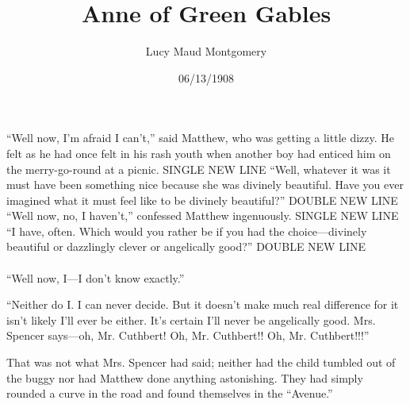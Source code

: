 \documentclass[a4paper]{article}
\title{Anne of Green Gables}
\author{Lucy Maud Montgomery}
\date{06/13/1908}
\begin{document}
\maketitle
``Well now, I'm afraid I can't,'' said Matthew, who was getting a little dizzy. He felt as he had once felt in his rash youth when another boy had enticed him on the merry-go-round at a picnic. SINGLE NEW LINE \newline ``Well, whatever it was it must have been something nice because she was divinely beautiful. Have you ever imagined what it must feel like to be divinely beautiful?'' DOUBLE NEW LINE \newline \newline ``Well now, no, I haven't,'' confessed Matthew ingenuously. SINGLE NEW LINE\\``I have, often. Which would you rather be if you had the choice---divinely beautiful or dazzlingly clever or angelically good?'' DOUBLE NEW LINE\\\\``Well now, I---I don't know exactly.''

``Neither do I. I can never decide. But it doesn't make much real difference for it isn't likely I'll ever be either. It's certain I'll never be angelically good. Mrs. Spencer says---oh, Mr. Cuthbert! Oh, Mr. Cuthbert!! Oh, Mr. Cuthbert!!!''

That was not what Mrs. Spencer had said; neither had the child tumbled out of the buggy nor had Matthew done anything astonishing. They had simply rounded a curve in the road and found themselves in the ``Avenue.''
\end{document}
